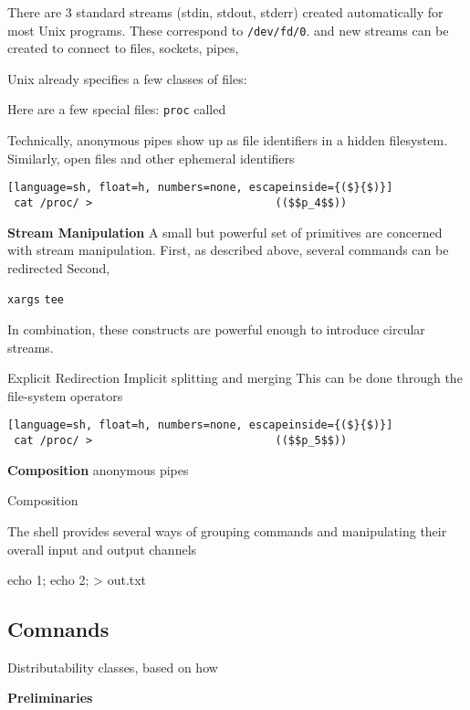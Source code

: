 \documentclass[sigplan,10pt,review,anonymous]{acmart}
\newcommand{\heading}[1]{\vspace{4pt}\noindent\textbf{#1}\enspace}
\newcommand{\ttt}[1]{\texttt{\small #1}}
\begin{document}
There are 3 standard streams (stdin, stdout, stderr) created automatically for most Unix programs.
These correspond to \ttt{/dev/fd/0}.
and new streams can be created to connect to files, sockets, pipes,

Unix already specifies a few classes of files:

Here are a few special files:
  \ttt{proc} called 

Technically, anonymous pipes show up as file identifiers in a hidden filesystem.
Similarly, open files and other ephemeral identifiers 


\begin{lstlisting}[language=sh, float=h, numbers=none, escapeinside={($}{$)}]
 cat /proc/ >                            (($$p_4$$))
\end{lstlisting}

\heading{Stream Manipulation}
A small but powerful set of primitives are concerned with stream manipulation.
First, as described above, several commands can be redirected
Second, 

\ttt{xargs}
\ttt{tee}

In combination, these constructs are powerful enough to introduce circular streams. %

Explicit Redirection
Implicit splitting and merging 
This can be done through the file-system operators 

\begin{lstlisting}[language=sh, float=h, numbers=none, escapeinside={($}{$)}]
 cat /proc/ >                            (($$p_5$$))
\end{lstlisting}

\heading{Composition}
anonymous pipes

Composition

The shell provides several ways of grouping commands and manipulating their
overall input and output channels 

{ echo 1; echo 2; } > out.txt

\subsection{Comnands}
\label{bg:cmd}


Distributability classes, based on how 

\heading{Preliminaries}
\end{document}
